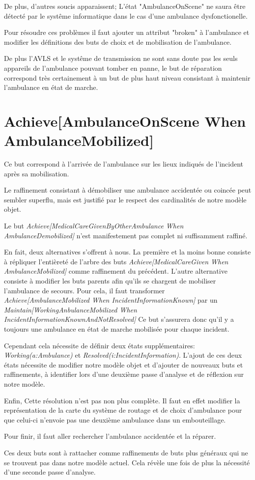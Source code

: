 	De plus, d'autres soucis apparaissent; L'état "AmbulanceOnScene"
	ne saura être détecté par le systême informatique dans le
	cas d'une ambulance dysfonctionelle.

	Pour résoudre ces problèmes il faut ajouter un attribut "broken"
	à l'ambulance et modifier les définitions des buts de choix et
	de mobilisation de l'ambulance. 

	De plus l'AVLS et le systême de transmission ne sont sans doute pas
	les seuls appareils de l'ambulance pouvant tomber en panne, le but
	de réparation correspond très certainement à un but de
	plus haut niveau consistant à maintenir l'ambulance en état de marche.

\section{Achieve[AmbulanceOnScene When AmbulanceMobilized]}
	Ce but correspond à l'arrivée de l'ambulance sur les lieux indiqués
	de l'incident après sa mobilisation.
	
	Le raffinement consistant à démobiliser une ambulance accidentée ou
	coincée peut sembler superflu, mais est justifié par le respect des
	cardinalités de notre modèle objet. 

	Le but \emph{Achieve[MedicalCareGivenByOtherAmbulance When AmbulanceDemobilized]}
	n'est manifestement pas complet ni suffisamment raffiné.
	
	En fait, deux alternatives s'offrent à nous. La première et la moins bonne
	consiste à répliquer l'entièreté de l'arbre des buts 
	\emph{Achieve[MedicalCareGiven When AmbulanceMobilized]}
	comme raffinement du précédent. L'autre alternative consiste à modifier
	les buts parents afin qu'ils se chargent de mobiliser l'ambulance de 
	secours. Pour cela, il faut transformer 
	\emph{Achieve[AmbulanceMobilized When IncidentInformationKnown]}
	par un \emph{Maintain[WorkingAnbulanceMobilized When IncidentInformationKnownAndNotResolved]}
	Ce but s'assurera donc qu'il y a toujours une ambulance en état de marche 
	mobilisée pour chaque incident. 
	
	Cependant cela nécessite de définir deux états supplémentaires:  
	\emph{Working(a:Ambulance)} et \emph{Resolved(i:IncidentInformation)}. 
	L'ajout de ces deux états nécessite de modifier notre modèle objet 
	et d'ajouter de nouveaux buts et raffinements, à identifier lors d'une 
	deuxième passe d'analyse et de réflexion sur notre modèle.

	Enfin, Cette résolution n'est pas non plus complète. Il faut en effet
	modifier la représentation de la carte du système de routage et de choix
	d'ambulance pour que celui-ci n'envoie pas une deuxième ambulance dans
	un embouteillage. 

	Pour finir, il faut aller rechercher l'ambulance accidentée et la 
	réparer. 

	Ces deux buts sont à rattacher comme raffinements de buts plus généraux
	qui ne se trouvent pas dans notre modèle actuel. Cela révèle une fois de
	plus la nécessité d'une seconde passe d'analyse.

